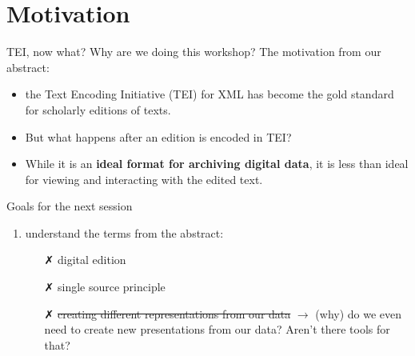 
\section{Motivation}

\begin{frame}{TEI, now what?}
    Why are we doing this workshop? The motivation from our abstract:
    \begin{itemize}
        \item \punkti the Text Encoding Initiative (TEI) for XML has become the gold standard for scholarly editions of texts.
        \item But what happens after an edition is encoded in TEI? 
        \item While it is an \textbf{ideal format for archiving digital data}, it is \alert{less than ideal for viewing and interacting with the edited text.}
    \end{itemize}
    
    \begin{block}{Goals for the next session}
    \begin{enumerate}
        \item understand the terms from the abstract:
        \begin{itemize}
            \item[\textcolor{alert}{\faClose}] digital edition
            \item[\textcolor{alert}{\faClose}] single source principle
            \item[\textcolor{alert}{\faClose}] \sout{creating different representations from our data} $\to$ (why) do we even need to create new presentations from our data? Aren't there tools for that?
        \end{itemize}
    \end{enumerate}
    \end{block}
\end{frame}


